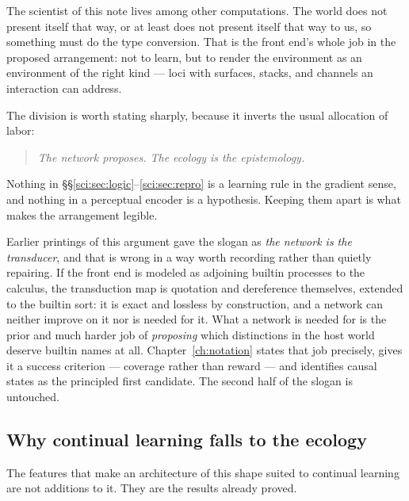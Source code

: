 The scientist of this note lives among other computations. The world does not present itself that way,
or at least does not present itself that way to us, so something must do the type conversion. That is
the front end's whole job in the proposed arrangement: not to learn, but to render the environment as
an environment of the right kind --- loci with surfaces, stacks, and channels an interaction can
address.

The division is worth stating sharply, because it inverts the usual allocation of labor:

\begin{quote}
\itshape The network proposes. The ecology is the epistemology.
\end{quote}

Nothing in \S\S\ref{sci:sec:logic}--\ref{sci:sec:repro} is a learning rule in the gradient sense, and nothing
in a perceptual encoder is a hypothesis. Keeping them apart is what makes the arrangement legible.

\begin{remark}
\label{sci:rem:transducer}
Earlier printings of this argument gave the slogan as \emph{the network is the transducer}, and that is
wrong in a way worth recording rather than quietly repairing. If the front end is modeled as adjoining
builtin processes to the calculus, the transduction map is quotation and dereference themselves, extended
to the builtin sort: it is exact and lossless by construction, and a network can neither improve on it nor
is needed for it. What a network is needed for is the prior and much harder job of \emph{proposing} which
distinctions in the host world deserve builtin names at all. Chapter~\ref{ch:notation} states that job
precisely, gives it a success criterion --- coverage rather than reward --- and identifies causal states as
the principled first candidate. The second half of the slogan is untouched.
\end{remark}

\subsection{Why continual learning falls to the ecology}\label{sci:S17.2}

The features that make an architecture of this shape suited to continual learning are not additions to
it. They are the results already proved.

